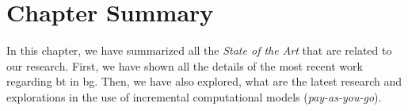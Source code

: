 \section{Chapter Summary}
In this chapter, we have summarized all the \emph{State of the Art} that are related to our research.
First, we have shown all the details of the most recent work regarding \acrlong{bt} in \acrlong{bg}.
Then, we have also explored, what are the latest research and explorations in the use of incremental computational models (\emph{pay-as-you-go}).
